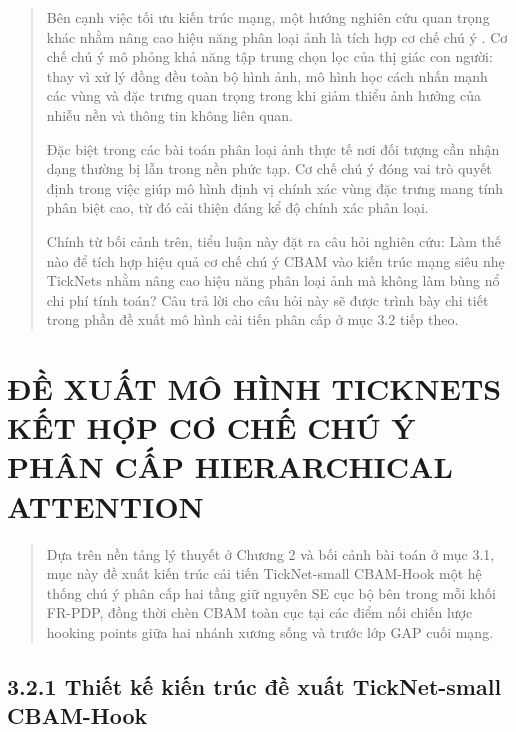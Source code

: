 \documentclass[
  12pt,
  a4paper,
]{report}
\begin{document}
\begin{quote}
Bên cạnh việc tối ưu kiến trúc mạng, một hướng nghiên cứu quan trọng
khác nhằm nâng cao hiệu năng phân loại ảnh là tích hợp cơ chế chú ý . Cơ
chế chú ý mô phỏng khả năng tập trung chọn lọc của thị giác con người:
thay vì xử lý đồng đều toàn bộ hình ảnh, mô hình học cách nhấn mạnh các
vùng và đặc trưng quan trọng trong khi giảm thiểu ảnh hưởng của nhiễu
nền và thông tin không liên quan.

Đặc biệt trong các bài toán phân loại ảnh thực tế nơi đối tượng cần nhận
dạng thường bị lẫn trong nền phức tạp. Cơ chế chú ý đóng vai trò quyết
định trong việc giúp mô hình định vị chính xác vùng đặc trưng mang tính
phân biệt cao, từ đó cải thiện đáng kể độ chính xác phân loại.

Chính từ bối cảnh trên, tiểu luận này đặt ra câu hỏi nghiên cứu: Làm thế
nào để tích hợp hiệu quả cơ chế chú ý CBAM vào kiến trúc mạng siêu nhẹ
TickNets nhằm nâng cao hiệu năng phân loại ảnh mà không làm bùng nổ chi
phí tính toán? Câu trả lời cho câu hỏi này sẽ được trình bày chi tiết
trong phần đề xuất mô hình cải tiến phân cấp ở mục 3.2 tiếp theo.
\end{quote}

\section{ĐỀ XUẤT MÔ HÌNH TICKNETS KẾT HỢP CƠ CHẾ CHÚ Ý PHÂN CẤP
HIERARCHICAL
ATTENTION}\label{ux111ux1ec1-xuux1ea5t-muxf4-huxecnh-ticknets-kux1ebft-hux1ee3p-cux1a1-chux1ebf-chuxfa-uxfd-phuxe2n-cux1ea5p-hierarchical-attention}

\begin{quote}
Dựa trên nền tảng lý thuyết ở Chương 2 và bối cảnh bài toán ở mục 3.1,
mục này đề xuất kiến trúc cải tiến TickNet-small CBAM-Hook một hệ thống
chú ý phân cấp hai tầng giữ nguyên SE cục bộ bên trong mỗi khối FR-PDP,
đồng thời chèn CBAM toàn cục tại các điểm nối chiến lược hooking points
giữa hai nhánh xương sống và trước lớp GAP cuối mạng.
\end{quote}

\subsection*{3.2.1 Thiết kế kiến trúc đề xuất TickNet-small
CBAM-Hook}\label{thiux1ebft-kux1ebf-kiux1ebfn-truxfac-ux111ux1ec1-xuux1ea5t-ticknet-small-cbam-hook}
\end{document}
